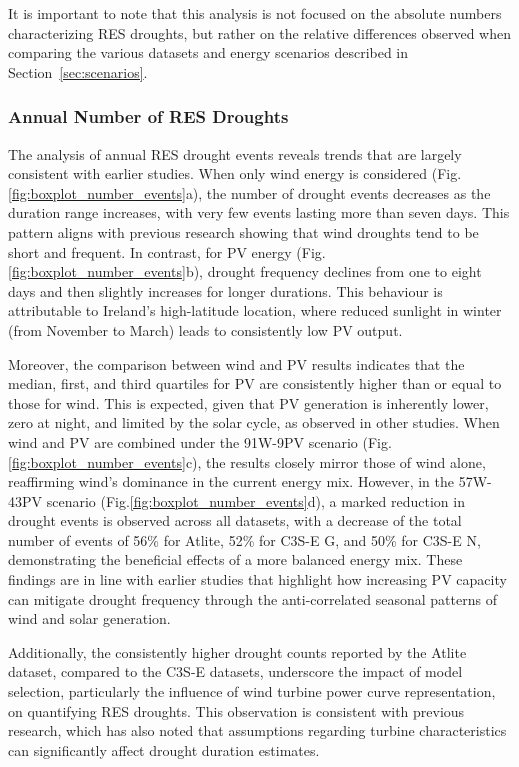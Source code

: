 \documentclass[preprint, 12pt]{elsarticle}
\begin{document}
It is important to note that this analysis is not focused on the absolute numbers characterizing RES droughts, but rather on the relative differences observed when comparing the various datasets and energy scenarios described in Section~\ref{sec:scenarios}.

\subsubsection{Annual Number of RES Droughts}

The analysis of annual RES drought events reveals trends that are largely consistent with earlier studies. When only wind energy is considered (Fig.\ref{fig:boxplot_number_events}a), the number of drought events decreases as the duration range increases, with very few events lasting more than seven days. This pattern aligns with previous research showing that wind droughts tend to be short and frequent. In contrast, for PV energy (Fig.\ref{fig:boxplot_number_events}b), drought frequency declines from one to eight days and then slightly increases for longer durations. This behaviour is attributable to Ireland's high-latitude location, where reduced sunlight in winter (from November to March) leads to consistently low PV output.

Moreover, the comparison between wind and PV results indicates that the median, first, and third quartiles for PV are consistently higher than or equal to those for wind. This is expected, given that PV generation is inherently lower, zero at night, and limited by the solar cycle, as observed in other studies. When wind and PV are combined under the 91W-9PV scenario (Fig.\ref{fig:boxplot_number_events}c), the results closely mirror those of wind alone, reaffirming wind’s dominance in the current energy mix. However, in the 57W-43PV scenario (Fig.\ref{fig:boxplot_number_events}d), a marked reduction in drought events is observed across all datasets, with a decrease of the total number of events of 56\% for Atlite, 52\% for C3S-E G, and 50\% for C3S-E N, demonstrating the beneficial effects of a more balanced energy mix. These findings are in line with earlier studies that highlight how increasing PV capacity can mitigate drought frequency through the anti-correlated seasonal patterns of wind and solar generation.

Additionally, the consistently higher drought counts reported by the Atlite dataset, compared to the C3S-E datasets, underscore the impact of model selection, particularly the influence of wind turbine power curve representation, on quantifying RES droughts. This observation is consistent with previous research, which has also noted that assumptions regarding turbine characteristics can significantly affect drought duration estimates.
\end{document}
